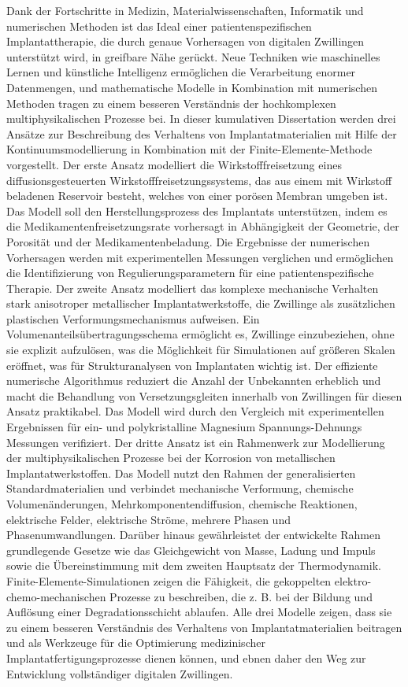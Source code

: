 Dank der Fortschritte in Medizin, Materialwissenschaften, Informatik und numerischen Methoden ist das Ideal einer patientenspezifischen Implantattherapie, die durch genaue Vorhersagen von digitalen Zwillingen unterstützt wird, in greifbare Nähe gerückt. Neue Techniken wie maschinelles Lernen und künstliche Intelligenz ermöglichen die Verarbeitung enormer Datenmengen, und mathematische Modelle in Kombination mit numerischen Methoden tragen zu einem besseren Verständnis der hochkomplexen multiphysikalischen Prozesse bei. In dieser kumulativen Dissertation werden drei Ansätze zur Beschreibung des Verhaltens von Implantatmaterialien mit Hilfe der Kontinuumsmodellierung in Kombination mit der Finite-Elemente-Methode vorgestellt. Der erste Ansatz modelliert die Wirkstofffreisetzung eines diffusionsgesteuerten Wirkstofffreisetzungssystems, das aus einem mit Wirkstoff beladenen Reservoir besteht, welches von einer porösen Membran umgeben ist. Das Modell soll den Herstellungsprozess des Implantats unterstützen, indem es die Medikamentenfreisetzungsrate vorhersagt in Abhängigkeit der Geometrie, der Porosität und der Medikamentenbeladung. Die Ergebnisse der numerischen Vorhersagen werden mit experimentellen Messungen verglichen und ermöglichen die Identifizierung von Regulierungsparametern für eine patientenspezifische Therapie. Der zweite Ansatz modelliert das komplexe mechanische Verhalten stark anisotroper metallischer Implantatwerkstoffe, die Zwillinge als zusätzlichen plastischen Verformungsmechanismus aufweisen. Ein Volumenanteilsübertragungsschema ermöglicht es, Zwillinge einzubeziehen, ohne sie explizit aufzulösen, was die Möglichkeit für Simulationen auf größeren Skalen eröffnet, was für Strukturanalysen von Implantaten wichtig ist. Der effiziente numerische Algorithmus reduziert die Anzahl der Unbekannten erheblich und macht die Behandlung von Versetzungsgleiten innerhalb von Zwillingen für diesen Ansatz praktikabel. Das Modell wird durch den Vergleich mit experimentellen Ergebnissen für ein- und polykristalline Magnesium Spannungs-Dehnungs Messungen verifiziert. Der dritte Ansatz ist ein Rahmenwerk zur Modellierung der multiphysikalischen Prozesse bei der Korrosion von metallischen Implantatwerkstoffen. Das Modell nutzt den Rahmen der generalisierten Standardmaterialien und verbindet mechanische Verformung, chemische Volumenänderungen, Mehrkomponentendiffusion, chemische Reaktionen, elektrische Felder, elektrische Ströme, mehrere Phasen und Phasenumwandlungen. Darüber hinaus gewährleistet der entwickelte Rahmen grundlegende Gesetze wie das Gleichgewicht von Masse, Ladung und Impuls sowie die Übereinstimmung mit dem zweiten Hauptsatz der Thermodynamik. Finite-Elemente-Simulationen zeigen die Fähigkeit, die gekoppelten elektro-chemo-mechanischen Prozesse zu beschreiben, die z. B. bei der Bildung und Auflösung einer Degradationsschicht ablaufen. Alle drei Modelle zeigen, dass sie zu einem besseren Verständnis des Verhaltens von Implantatmaterialien beitragen und als Werkzeuge für die Optimierung medizinischer Implantatfertigungsprozesse dienen können, und ebnen daher den Weg zur Entwicklung vollständiger digitalen Zwillingen. 
